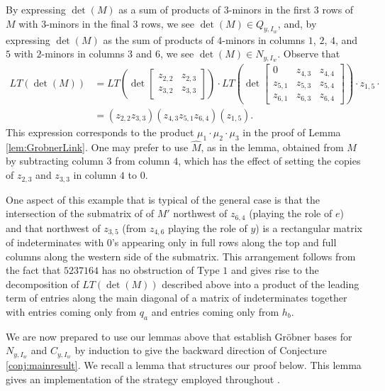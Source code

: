 \documentclass[ALCO,Unicode,published]{cedram}
\begin{document}
\begin{example}
 By expressing $\det(M)$ as a sum of products of $3$-minors in the first $3$ rows of $M$ with $3$-minors in the final $3$ rows, we see $\det(M) \in Q_{y,I_w}$, and, by expressing $\det(M)$ as the sum of products of $4$-minors in columns $1$, $2$, $4$, and $5$ with $2$-minors in columns $3$ and $6$, we see $\det(M) \in N_{y,I_w}$.  Observe that \begin{align*}
 LT(\det(M)) &=  LT\left(\det \begin{bmatrix} z_{2,2} & z_{2,3} \\ z_{3,2} & z_{3,3} \end{bmatrix} \right) \cdot LT\left(\det  \begin{bmatrix} 0 & z_{4,3} & z_{4,4} \\ z_{5,1} & z_{5,3} & z_{5,4} \\ z_{6,1} & z_{6,3} & z_{6,4} \end{bmatrix}\right) \cdot z_{1,5} \cdot\\
 &= (z_{2,2}z_{3,3})(z_{4,3}z_{5,1}z_{6,4})(z_{1,5}).
 \end{align*}
 This expression corresponds to the product $\mu_1 \cdot \mu_2 \cdot \mu_3$ in the proof of Lemma \ref{lem:GrobnerLink}.  One may prefer to use $\widehat{M}$, as in the lemma, obtained from $M$ by subtracting column $3$ from column $4$, which has the effect of setting the copies of $z_{2,3}$ and $z_{3,3}$ in column $4$ to $0$.  
 
One aspect of this example that is typical of the general case is that the intersection of the submatrix of of $M'$ northwest of $z_{6,4}$ (playing the role of $e$) and that northwest of $z_{3,5}$ (from $z_{4,6}$ playing the role of $y$) is a rectangular matrix of indeterminates with $0$'s appearing only in full rows along the top and full columns along the western side of the submatrix.  This arrangement follows from the fact that $5237164$ has no obstruction of Type $1$ and gives rise to the decomposition of $LT(\det(M))$ described above into a product of the leading term of entries along the main diagonal of a matrix of indeterminates together with entries coming only from $q_a$ and entries coming only from $h_b$.
\end{example}

We are now prepared to use our lemmas above that establish Gr\"obner bases for $N_{y,I_w}$ and $C_{y,I_w}$ by induction to give the backward direction of Conjecture \ref{conj:mainresult}.  We recall a lemma that structures our proof below.  This lemma gives an implementation of the strategy employed throughout \cite{GMN13}.  
\end{document}
